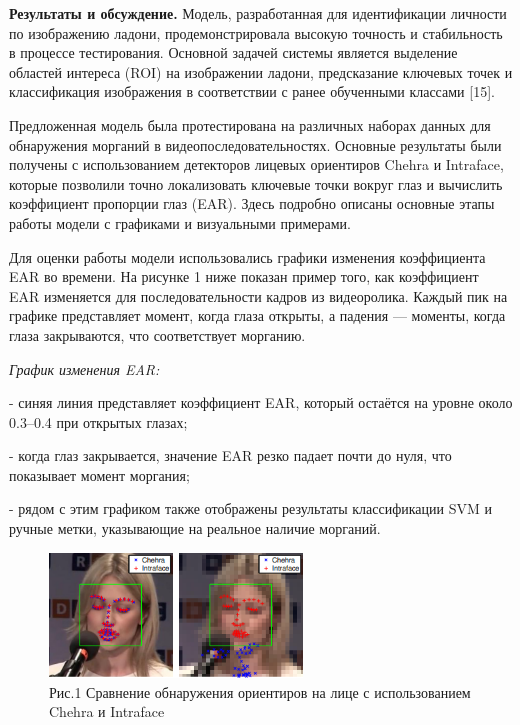 \begin{multicols}{2}
{\bfseries Результаты и обсуждение.} Модель, разработанная для
идентификации личности по изображению ладони, продемонстрировала высокую
точность и стабильность в процессе тестирования. Основной задачей
системы является выделение областей интереса (ROI) на изображении
ладони, предсказание ключевых точек и классификация изображения в
соответствии с ранее обученными классами {[}15{]}.

Предложенная модель была протестирована на различных наборах данных для
обнаружения морганий в видеопоследовательностях. Основные результаты
были получены с использованием детекторов лицевых ориентиров Chehra и
Intraface, которые позволили точно локализовать ключевые точки вокруг
глаз и вычислить коэффициент пропорции глаз (EAR). Здесь подробно
описаны основные этапы работы модели с графиками и визуальными
примерами.

Для оценки работы модели использовались графики изменения коэффициента
EAR во времени. На рисунке 1 ниже показан пример того, как коэффициент
EAR изменяется для последовательности кадров из видеоролика. Каждый пик
на графике представляет момент, когда глаза открыты, а падения ---
моменты, когда глаза закрываются, что соответствует морганию.

\emph{График изменения EAR:}

- синяя линия представляет коэффициент EAR, который остаётся на уровне
около 0.3--0.4 при открытых глазах;

- когда глаз закрывается, значение EAR резко падает почти до нуля, что
показывает момент моргания;

- рядом с этим графиком также отображены результаты классификации SVM и
ручные метки, указывающие на реальное наличие морганий.
\end{multicols}

\begin{figure}[H]
	\centering
	\includegraphics[width=0.6\textwidth]{media/ict/image15}
	\caption*{Рис.1 Сравнение обнаружения ориентиров на лице с использованием Chehra и Intraface}
\end{figure}

